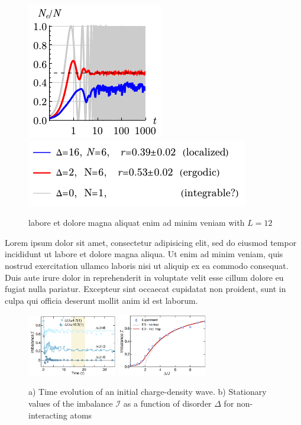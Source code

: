 \begin{figure}[h]
    \centering
    \hspace{10 mm} 
    \includegraphics[align=c]{imgs/lo2.pdf}
    \hspace{1 mm} 
    \includegraphics[align=c]{imgs/lo2l.pdf}
    \caption{labore et dolore magna aliquat enim ad minim veniam with $L=12$}
\end{figure}

Lorem ipsum dolor sit amet, consectetur adipisicing elit, sed do eiusmod
tempor incididunt ut labore et dolore magna aliqua. Ut enim ad minim veniam,
quis nostrud exercitation ullamco laboris nisi ut aliquip ex ea commodo
consequat. Duis aute irure dolor in reprehenderit in voluptate velit esse
cillum dolore eu fugiat nulla pariatur. Excepteur sint occaecat cupidatat non
proident, sunt in culpa qui officia deserunt mollit anim id est laborum.



\begin{figure}[h]
    \centering
    \includegraphics[align=c, width=0.35\textwidth]{imgs/MBL_exp_1.png}
    \hspace{10 mm} 
    \includegraphics[align=c, width=0.35\textwidth]{imgs/MBL_exp_2.png}
    \caption{a) Time evolution of an initial charge-density wave. b) Stationary values of the imbalance $\mathcal{I}$ as a function of disorder $\Delta$ for non-interacting atoms }
\end{figure}
